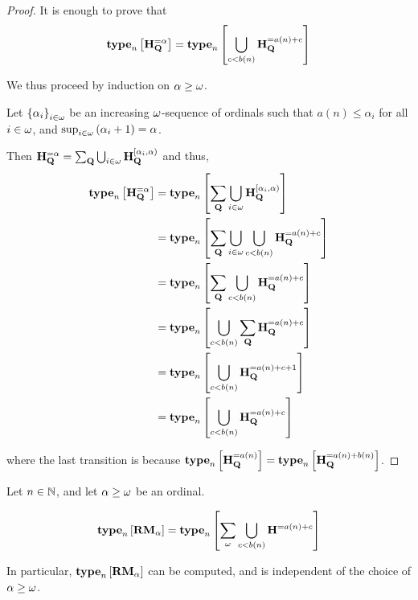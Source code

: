 \begin{proof}
    It is enough to prove that
    \[
        \mathbf{type}_{n} \left[ {\mathbf{H}_{\mathbf{Q}}^{= \alpha}} \right] = \mathbf{type}_{n} \left[ {\bigcup_{c < b(n)}{\mathbf{H}_{\mathbf{Q}}^{= a(n) + c}}} \right]
    \]

    We thus proceed by induction on $\alpha \ge \omega$.

    Let $\left\{ {\alpha_i} \right\}_{i \in \omega}$ be an increasing $\omega$-sequence of ordinals
    such that $a(n) \le \alpha_i$ for all $i \in \omega$,
    and $\sup_{i \in \omega} \left( {\alpha_i + 1} \right) = \alpha$.

    Then $\mathbf{H}_{\mathbf{Q}}^{= \alpha} = \sum_{\mathbf{Q}}{\bigcup_{i \in \omega} \mathbf{H}_{\mathbf{Q}}^{[\alpha_i, \alpha)}}$ and thus,
    \begin{align*}
        \mathbf{type}_{n} \left[ {\mathbf{H}_{\mathbf{Q}}^{= \alpha}} \right]
         & = \mathbf{type}_{n} \left[ {\sum_{\mathbf{Q}} \bigcup_{i \in \omega} \mathbf{H}_{\mathbf{Q}}^{[\alpha_i, \alpha)}} \right]             \\
         & = \mathbf{type}_{n} \left[ {\sum_{\mathbf{Q}} \bigcup_{i \in \omega} \bigcup_{c < b(n)}{\mathbf{H}_{\mathbf{Q}}^{= a(n) + c}}} \right] \\
         & = \mathbf{type}_{n} \left[ {\sum_{\mathbf{Q}} \bigcup_{c < b(n)}{\mathbf{H}_{\mathbf{Q}}^{= a(n) + c}}} \right]                        \\
         & = \mathbf{type}_{n} \left[ {\bigcup_{c < b(n)}{\sum_{\mathbf{Q}} \mathbf{H}_{\mathbf{Q}}^{= a(n) + c}}} \right]                        \\
         & = \mathbf{type}_{n} \left[ {\bigcup_{c < b(n)}{\mathbf{H}_{\mathbf{Q}}^{= a(n) + c + 1}}} \right]                               \\
         & = \mathbf{type}_{n} \left[ {\bigcup_{c < b(n)}{\mathbf{H}_{\mathbf{Q}}^{= a(n) + c}}} \right]
    \end{align*}

    where the last transition is because $\mathbf{type}_{n} \left[ {\mathbf{H}_{\mathbf{Q}}^{= a(n)}} \right] = \mathbf{type}_{n} \left[ {\mathbf{H}_{\mathbf{Q}}^{= a(n) + b(n)}} \right]$.
\end{proof}

\begin{corollary}
    Let $n \in \mathbb{N}$, and let $\alpha \ge \omega$ be an ordinal.

    \[
        \mathbf{type}_{n} \left[ {\mathbf{RM}_{\alpha}} \right]
        = \mathbf{type}_{n} \left[ {\sum_{\omega} {\bigcup_{c < b(n)}{\mathbf{H}_{}^{= a(n) + c}}}} \right]
    \]

    In particular, $\mathbf{type}_{n} \left[ {\mathbf{RM}_{\alpha}} \right]$ can be
    computed, and is independent of the choice of $\alpha \ge \omega$.
\end{corollary}

